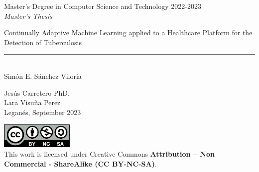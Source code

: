 \documentclass[../main.tex]{subfiles}
\begin{document}
\begin{titlepage}
	\begin{sffamily}
	\color{azulUC3M}
	\begin{center}
		\begin{figure}[H] %
		\end{figure}
		\vspace{2.5cm}
		\begin{Large}
			Master's Degree in Computer Science and Technology
			2022-2023\\
			\vspace{2cm}		
			\textsl{Master's Thesis}
			\bigskip 
			
			{\Huge 
				Continually Adaptive Machine Learning
				applied to a Healthcare Platform
				for the Detection of Tuberculosis
			}\\ %
		\end{Large}
	 		\rule{10.5cm}{0.1mm}\\
			{\LARGE Simón E. Sánchez Viloria }\\ 
			\vspace*{1cm}
		\begin{Large}
			Jesús Carretero PhD.\\ Lara Visuña Perez \\
			Leganés, September 2023\\ %
		\end{Large}
	\end{center}
	\vfill
	\color{black}
	\includegraphics[width=3.5cm]{figures/creativecommons.png}\\  %
	This work is licensed under Creative Commons \textbf{Attribution – Non Commercial - ShareAlike (CC BY-NC-SA)}.
	\end{sffamily}
\end{titlepage}
\end{document}
